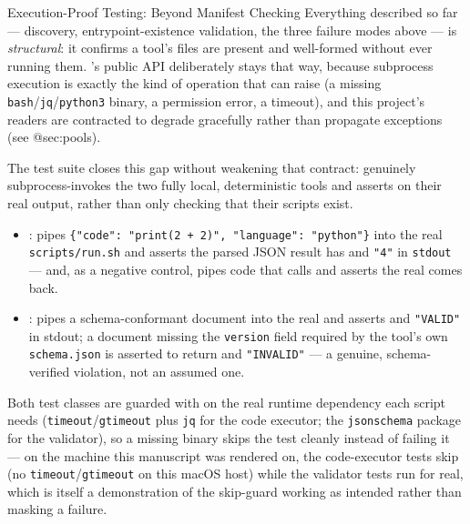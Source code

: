 \documentclass[
  ignorenonframetext,
]{beamer}
\providecommand{\tightlist}{%
  \setlength{\itemsep}{0pt}\setlength{\parskip}{0pt}}
\begin{document}
\begin{frame}{Execution-Proof Testing: Beyond
Manifest Checking}
\protect{}\label{execution-proof-testing-beyond-manifest-checking}
Everything described so far --- discovery, entrypoint-existence
validation, the three failure modes above --- is \emph{structural}: it
confirms a tool's files are present and well-formed without ever running
them. 's public API deliberately stays
that way, because subprocess execution is exactly the kind of operation
that can raise (a missing \texttt{bash}/\texttt{jq}/\texttt{python3}
binary, a permission error, a timeout), and this project's readers are
contracted to degrade gracefully rather than propagate exceptions (see
@sec:pools).

The test suite closes this gap without weakening that contract:
 genuinely subprocess-invokes the
two fully local, deterministic tools and asserts on their real output,
rather than only checking that their scripts exist.

\begin{itemize}
\tightlist
\item
  \textbf{}:
   pipes
  \texttt{\{"code":\ "print(2\ +\ 2)",\ "language":\ "python"\}} into
  the real \texttt{scripts/run.sh} and asserts the parsed JSON result
  has  and \texttt{"4"} in \texttt{stdout} ---
  and, as a negative control, pipes code that calls
   and asserts the real
   comes back.
\item
  \textbf{}: 
  pipes a schema-conformant document into the real
   and asserts 
  and \texttt{"VALID"} in stdout; a document missing the
  \texttt{version} field required by the tool's own \texttt{schema.json}
  is asserted to return  and
  \texttt{"INVALID"} --- a genuine, schema-verified violation, not an
  assumed one.
\end{itemize}

Both test classes are guarded with  on the
real runtime dependency each script needs
(\texttt{timeout}/\texttt{gtimeout} plus \texttt{jq} for the code
executor; the \texttt{jsonschema} package for the validator), so a
missing binary skips the test cleanly instead of failing it --- on the
machine this manuscript was rendered on, the code-executor tests skip
(no \texttt{timeout}/\texttt{gtimeout} on this macOS host) while the
validator tests run for real, which is itself a demonstration of the
skip-guard working as intended rather than masking a failure.
\end{frame}
\end{document}
